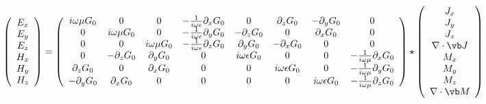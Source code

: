 \documentclass[letterpaper]{article}
\begin{document}
$$
 \left(\begin{array}{c}
 E_x \\ E_y \\ E_z \\ H_x \\ H_y \\ H_z
 \end{array}\right)
=
 \left(\begin{array}{cccccccc} 
 i\omega \mu G_0 & 0 & 0 & -\frac{1}{i\omega\epsilon}\partial_x G_0  &
 0 & \partial_z G_0 & -\partial_y G_0 & 0 \\
 0 & i\omega \mu G_0 & 0 & -\frac{1}{i\omega\epsilon}\partial_y G_0  &
 -\partial_z G_0 & 0 & \partial_x G_0 & 0 \\
 0 & 0 & i\omega\mu G_0  & -\frac{1}{i\omega\epsilon}\partial_z G_0  &
 \partial_y G_0 & -\partial_x G_0 & 0 & 0 \\
 0 & -\partial_z G_0 & \partial_y G_0 & 0 & 
 i\omega \epsilon G_0 & 0 & 0 & -\frac{1}{i\omega\mu}\partial_x G_0\\
 \partial_z G_0 & 0 & \partial_x G_0 & 0 &
 0 & i\omega \epsilon G_0 & 0 & -\frac{1}{i\omega\mu}\partial_y G_0\\
 -\partial_y G_0 & \partial_x G_0 & 0 & 0 &
 0 & 0 & i\omega \epsilon G_0 & -\frac{1}{i\omega\mu}\partial_z G_0
\end{array}\right)
\star
 \left(\begin{array}{c}
 J_x \\ J_y \\ J_z \\ \nabla \cdot \vb J \\ M_x \\ M_y \\ M_z \\ \nabla \cdot \vb M
 \end{array}\right)
$$
\renewcommand{\arraystretch}{1.0}
\end{document}

